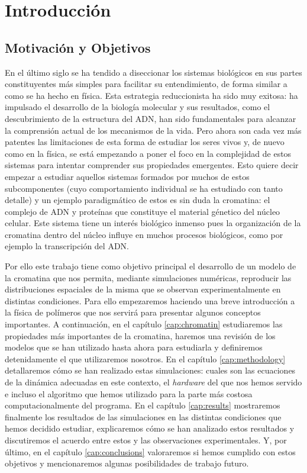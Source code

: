 \chapter{Introducción}
\label{cap:introduction}

\section{Motivación y Objetivos}

En el último siglo se ha tendido a diseccionar los sistemas biológicos en sus partes constituyentes más simples para facilitar su entendimiento, de forma similar a como se ha hecho en física. Esta estrategia reduccionista ha sido muy exitosa: ha impulsado el desarrollo de la biología molecular y sus resultados, como el descubrimiento de la estructura del ADN, han sido fundamentales para alcanzar la comprensión actual de los mecanismos de la vida. Pero ahora son cada vez más patentes las limitaciones de esta forma de estudiar los seres vivos y, de nuevo como en la física, se está empezando a poner el foco en la complejidad de estos sistemas para intentar comprender sus propiedades emergentes. Esto quiere decir empezar a estudiar aquellos sistemas formados por muchos de estos subcomponentes (cuyo comportamiento individual se ha estudiado con tanto detalle) y un ejemplo paradigmático de estos es sin duda la cromatina: el complejo de ADN y proteínas que constituye el material génetico del núcleo celular. Este sistema tiene un interés biológico inmenso pues la organización de la cromatina dentro del núcleo influye en muchos procesos biológicos, como por ejemplo la transcripción del ADN.

Por ello este trabajo tiene como objetivo principal el desarrollo de un modelo de la cromatina que nos permita, mediante simulaciones numéricas, reproducir las distribuciones espaciales de la misma que se observan experimentalmente en distintas condiciones. Para ello empezaremos haciendo una breve introducción a la física de polímeros que nos servirá para presentar algunos conceptos importantes. A continuación, en el capítulo \ref{cap:chromatin} estudiaremos las propiedades más importantes de la cromatina, haremos una revisión de los modelos que se han utilizado hasta ahora para estudiarla y definiremos detenidamente el que utilizaremos nosotros. En el capítulo \ref{cap:methodology} detallaremos cómo se han realizado estas simulaciones: cuales son las ecuaciones de la dinámica adecuadas en este contexto, el \textit{hardware} del que nos hemos servido e incluso el algoritmo que hemos utilizado para la parte más costosa computacionalmente del programa. En el capítulo \ref{cap:results} mostraremos finalmente los resultados de las simulaciones en las distintas condiciones que hemos decidido estudiar, explicaremos cómo se han analizado estos resultados y discutiremos el acuerdo entre estos y las observaciones experimentales. Y, por último, en el capítulo \ref{cap:conclusions} valoraremos si hemos cumplido con estos objetivos y mencionaremos algunas posibilidades de trabajo futuro.

